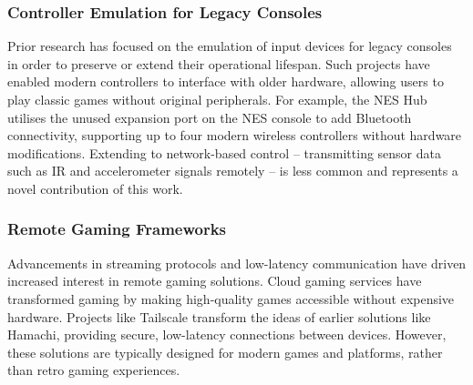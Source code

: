 \subsubsection{Controller Emulation for Legacy Consoles}
Prior research has focused on the emulation of input devices for legacy consoles in order to preserve or extend their operational lifespan. Such projects have enabled modern controllers to interface with older hardware, allowing users to play classic games without original peripherals. For example, the NES Hub utilises the unused expansion port on the NES console to add Bluetooth connectivity, supporting up to four modern wireless controllers without hardware modifications\cite{thevergeWirelessController}. Extending to network-based control -- transmitting sensor data such as IR and accelerometer signals remotely -- is less common and represents a novel contribution of this work.

\subsubsection{Remote Gaming Frameworks}
Advancements in streaming protocols and low-latency communication have driven increased interest in remote gaming solutions. Cloud gaming services have transformed gaming by making high-quality games accessible without expensive hardware\cite{cloud_gaming}. Projects like Tailscale transform the ideas of earlier solutions like Hamachi, providing secure, low-latency connections between devices\cite{tailscaleTailscaleHamachi}. However, these solutions are typically designed for modern games and platforms, rather than retro gaming experiences.
